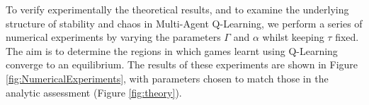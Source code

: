 \documentclass[sigconf,anonymous]{aamas}
\begin{document}
To verify experimentally the theoretical results, and to examine the underlying structure of stability and chaos in
Multi-Agent Q-Learning, we perform a series of numerical experiments by varying the parameters $\Gamma$ and
$\alpha$ whilst keeping $\tau$ fixed. The aim is to determine the regions in which games learnt using Q-Learning converge to an equilibrium. The results of these experiments are shown in Figure \ref{fig:NumericalExperiments}, with parameters chosen to match those in the analytic assessment (Figure \ref{fig:theory}).



\end{document}

